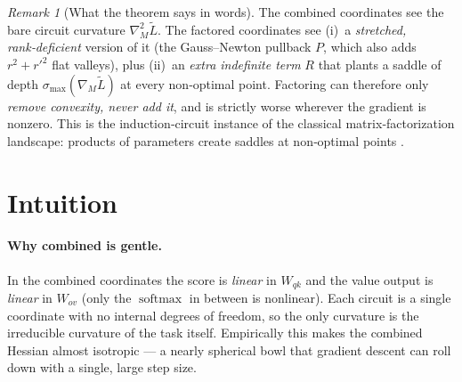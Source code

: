 \documentclass[11pt]{article}
\theoremstyle{remark}
\newtheorem{remark}{Remark}
\newcommand{\Wqk}{W_{qk}}
\newcommand{\Wov}{W_{ov}}
\newcommand{\softmax}{\operatorname{softmax}}
\newcommand{\Hess}{\nabla^2}
\begin{document}
\begin{remark}[What the theorem says in words]
The combined coordinates see the bare circuit curvature $\Hess_M\widetilde L$.
The factored coordinates see (i)~a \emph{stretched, rank‑deficient} version of it
(the Gauss--Newton pullback $P$, which also adds $r^2{+}r'^2$ flat valleys), plus
(ii)~an \emph{extra indefinite term} $R$ that plants a saddle of depth
$\sigma_{\max}(\nabla_M\widetilde L)$ at every non‑optimal point. Factoring can
therefore only \emph{remove convexity, never add it}, and is strictly worse
wherever the gradient is nonzero. This is the induction‑circuit instance of the
classical matrix‑factorization landscape: products of parameters create saddles
at non‑optimal points
\cite{BaldiHornik1989,Kawaguchi2016,GeLeeMa2016,SaxeMcCGanguli2014}.
\end{remark}

\section{Intuition}\label{sec:intuition}

\paragraph{Why combined is gentle.}
In the combined coordinates the score is \emph{linear} in $\Wqk$ and the value
output is \emph{linear} in $\Wov$ (only the $\softmax$ in between is nonlinear).
Each circuit is a single coordinate with no internal degrees of freedom, so the
only curvature is the irreducible curvature of the task itself. Empirically this
makes the combined Hessian almost isotropic --- a nearly spherical bowl that
gradient descent can roll down with a single, large step size.
\end{document}
